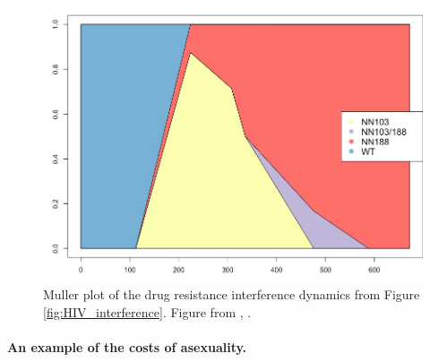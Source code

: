 \begin{figure}
\begin{center}
  \includegraphics[width = \textwidth]{Journal_figs/recom_selection/Pleuni_HIV_interference/DdweQyxU0AA7mXe.jpg}
\end{center}
\caption{Muller plot of the drug resistance interference dynamics from Figure \ref{fig:HIV_interference}. Figure from \citet{Williams548198}, \PLOSccBY.} \label{fig:HIV_interference_M}  %
\end{figure}


\paragraph{An example of the costs of asexuality.}

